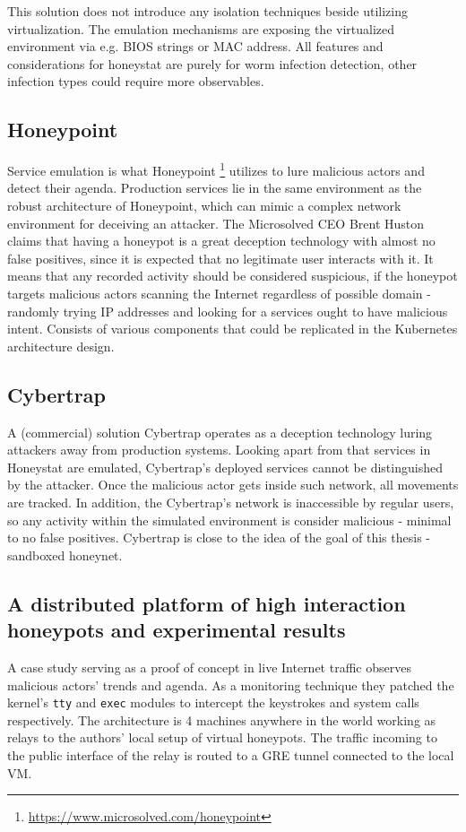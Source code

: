 This solution does not introduce any isolation techniques beside utilizing virtualization. The emulation mechanisms are exposing the virtualized environment via e.g. BIOS strings or MAC address. All features and considerations for honeystat are purely for worm infection detection, other infection types could require more observables.

\subsection{Honeypoint \label{related:active-anal:honeypoint}}
Service emulation is what Honeypoint \footnote{\url{https://www.microsolved.com/honeypoint}} utilizes to lure malicious actors and detect their agenda. Production services lie in the same environment as the robust architecture of Honeypoint, which can mimic a complex network environment for deceiving an attacker. The Microsolved CEO Brent Huston claims \cite{podcast:honeypoint} that having a honeypot is a great deception technology with almost no false positives, since it is expected that no legitimate user interacts with it. It means that any recorded activity should be considered suspicious, if the honeypot targets malicious actors scanning the Internet regardless of possible domain - randomly trying IP addresses and looking for a services ought to have malicious intent. Consists of various components \cite{docs:honeypoint} that could be replicated in the Kubernetes architecture design.

\subsection{Cybertrap \label{related:active-anal:cybertrap}}
A (commercial) solution Cybertrap \cite{site:cybertrap} operates as a deception technology luring attackers away from production systems. Looking apart from that services in Honeystat are emulated, Cybertrap's deployed services cannot be distinguished by the attacker. Once the malicious actor gets inside such network, all movements are tracked. In addition, the Cybertrap's network is inaccessible by regular users, so any activity within the simulated environment is consider malicious - minimal to no false positives. Cybertrap is close to the idea of the goal of this thesis - sandboxed honeynet.

\subsection{A distributed platform of high interaction honeypots and experimental results \label{related:active-anal:hih-study}}
A case study \cite{study:hih} serving as a proof of concept in live Internet traffic observes malicious actors' trends and agenda. As a monitoring technique they patched the kernel's \texttt{tty} and \texttt{exec} modules to intercept the keystrokes and system calls respectively. The architecture is 4 machines anywhere in the world working as relays to the authors' local setup of virtual honeypots. The traffic incoming to the public interface of the relay is routed to a GRE tunnel connected to the local VM.

